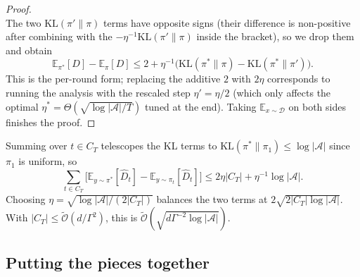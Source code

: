 \documentclass[11pt]{article}
\newcommand{\Otilde}{\tilde{\mathcal{O}}}
\newcommand{\E}{\mathbb{E}}
\begin{document}
\begin{proof}
\[\]
The two $\mathrm{KL}(\pi'\|\pi)$ terms have opposite signs (their difference is non-positive after combining with the $-\eta^{-1}\mathrm{KL}(\pi'\|\pi)$ inside the bracket), so we drop them and obtain
\[
  \E_{\pi^*}[D] - \E_\pi[D]
  \le 2 + \eta^{-1}\bigl(\mathrm{KL}(\pi^* \| \pi) - \mathrm{KL}(\pi^* \| \pi')\bigr).
\]
This is the per-round form; replacing the additive $2$ with $2\eta$ corresponds to running the analysis with the rescaled step $\eta' = \eta/2$ (which only affects the optimal $\eta^* = \Theta(\sqrt{\log|\mathcal{A}|/T})$ tuned at the end). Taking $\E_{x \sim \mathcal{D}}$ on both sides finishes the proof.
\end{proof}

Summing over $t \in C_T$ telescopes the KL terms to $\mathrm{KL}(\pi^* \| \pi_1) \le \log|\mathcal{A}|$ since $\pi_1$ is uniform, so
\begin{equation}
  \sum_{t \in C_T} \bigl[ \E_{y \sim \pi^*}[\hat D_t] - \E_{y \sim \pi_t}[\hat D_t] \bigr]
  \le 2\eta |C_T| + \eta^{-1} \log|\mathcal{A}|.
  \label{eq:oppo-summed}
\end{equation}
Choosing $\eta = \sqrt{\log|\mathcal{A}| / (2 |C_T|)}$ balances the two terms at $2\sqrt{2 |C_T| \log|\mathcal{A}|}$. With $|C_T| \le \Otilde(d / \Gamma^2)$, this is $\Otilde(\sqrt{d \Gamma^{-2} \log|\mathcal{A}|})$.

\subsection{Putting the pieces together}
\end{document}
